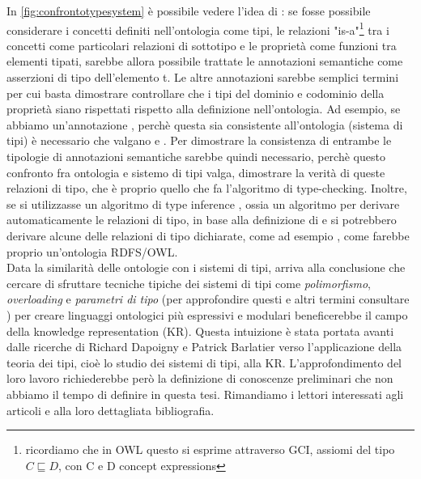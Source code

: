 In \autoref{fig:confrontotypesystem} è possibile vedere l'idea di \cite{despeyroux2008evolution}: se fosse possibile considerare i concetti definiti nell'ontologia come tipi, le relazioni "is-a"\footnote{ricordiamo che in OWL questo si esprime attraverso GCI, assiomi del tipo $C \sqsubseteq D$, con C e D concept expressions} tra i concetti come particolari relazioni di sottotipo e le proprietà come funzioni tra elementi tipati, sarebbe allora possibile trattate le annotazioni semantiche  come asserzioni di tipo dell'elemento t. Le altre annotazioni sarebbe semplici termini per cui basta dimostrare controllare che i tipi del dominio e codominio della proprietà siano rispettati rispetto alla definizione nell'ontologia. Ad esempio, se abbiamo un'annotazione , perchè questa sia consistente all'ontologia (sistema di tipi) è necessario che valgano  e . Per dimostrare la consistenza di entrambe le tipologie di annotazioni semantiche sarebbe quindi necessario, perchè questo confronto fra ontologia e sistemo di tipi valga, dimostrare la verità di queste relazioni di tipo, che è proprio quello che fa l'algoritmo di type-checking. Inoltre, se si utilizzasse un algoritmo di type inference \cite{cardoneTypeInference, martellimontanaritypeinference}, ossia un algoritmo per derivare automaticamente le  relazioni di tipo, in base alla definizione di  e  si potrebbero derivare alcune delle relazioni di tipo dichiarate, come ad esempio , come farebbe proprio un'ontologia RDFS/OWL.\\
Data la similarità delle ontologie con i sistemi di tipi, \cite{despeyroux2008evolution} arriva alla conclusione che cercare di sfruttare tecniche tipiche dei sistemi di tipi come \textit{polimorfismo}, \textit{overloading} e \textit{parametri di tipo} (per approfondire questi e altri termini consultare \cite{pierceTypesBook}) per creare linguaggi ontologici più espressivi e modulari beneficerebbe il campo della knowledge representation (KR). Questa intuizione è stata portata avanti dalle ricerche di Richard Dapoigny e Patrick Barlatier verso l'applicazione della teoria dei tipi, cioè lo studio dei sistemi di tipi, alla KR. L'approfondimento del loro lavoro richiederebbe però la definizione di conoscenze preliminari che non abbiamo il tempo di definire in questa tesi. Rimandiamo i lettori interessati agli articoli \cite{dapoigny2011typetheoryKR, dapoigny2012typetheoryKR} e alla loro dettagliata bibliografia.

